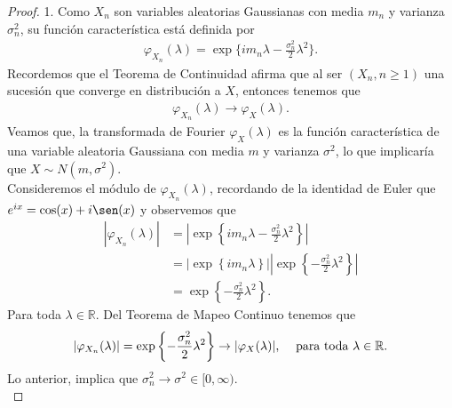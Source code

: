 \begin{proof}
1. Como $X_n$ son variables aleatorias Gaussianas con media $m_n$ y varianza $\sigma_n^2$, su función característica está definida por
	\begin{align*}
	\varphi_{X_n} (\lambda) = \exp \{i m_n \lambda - \frac{\sigma_n^2}{2} \lambda^2\}. %
	\end{align*}
Recordemos que el Teorema de Continuidad \cite[p.~322]{shiryaev} afirma que al ser $(X_n, n \geq 1)$ una sucesión que converge en distribución a $X$, entonces tenemos que 
	\begin{align*}
	\varphi_{X_n} (\lambda) \rightarrow \varphi_{X} (\lambda). 
	\end{align*}
Veamos que, la transformada de Fourier $\varphi_X(\lambda)$ es la función característica de una variable aleatoria Gaussiana con media $m$ y varianza $\sigma^2$, lo que implicaría que $X \sim N(m, \sigma^2)$. \\

Consideremos el módulo de $\varphi_{X_n} (\lambda)$, recordando de la identidad de Euler que $e^{ix} = \cos(x) + i \sen(x)$ y observemos que
	\begin{align*}
	|\varphi_{X_n} (\lambda)| &=  \left \lvert \exp \left\{i m_n \lambda - \frac{\sigma_n^2}{2} \lambda^2 \right\} \right \rvert \\
	& = \bigg \lvert \exp \left\{i m_n \lambda \right\} \bigg \rvert  \left\lvert \exp \left\{ - \frac{\sigma_n^2}{2} \lambda^2 \right\} \right\rvert\\
	& = \exp \left\{- \frac{\sigma_n^2}{2} \lambda^2 \right\}.
	\end{align*}
Para toda $\lambda \in \mathbb{R}$. Del Teorema de Mapeo Continuo \cite[p.~21]{billingsley} tenemos que
	\begin{align*}
	|\varphi_{X_n} (\lambda)| = \exp \left\{- \frac{\sigma_n^2}{2} \lambda^2 \right\} \rightarrow |\varphi_X (\lambda)|, \hspace{0.3cm} \text{ para toda } \lambda \in \mathbb{R}.
	\end{align*}
Lo anterior, implica que  $\sigma_n^2 \rightarrow \sigma^2 \in [0, \infty)$. \\


\end{proof}
